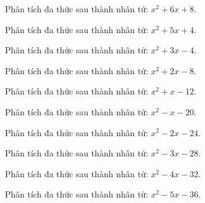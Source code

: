 \begin{bt}
	Phân tích đa thức sau thành nhân tử: $x^2 + 6 x + 8$.
\end{bt}
\begin{bt}
	Phân tích đa thức sau thành nhân tử: $x^2 + 5 x + 4$.
\end{bt}
\begin{bt}
	Phân tích đa thức sau thành nhân tử: $x^2 + 3 x - 4$.
\end{bt}
\begin{bt}
	Phân tích đa thức sau thành nhân tử: $x^2 + 2 x - 8$.
\end{bt}
\begin{bt}
	Phân tích đa thức sau thành nhân tử: $x^2 + x - 12$.
\end{bt}
\begin{bt}
	Phân tích đa thức sau thành nhân tử: $x^2 - x - 20$.
\end{bt}
\begin{bt}
	Phân tích đa thức sau thành nhân tử: $x^2 - 2 x - 24$.
\end{bt}
\begin{bt}
	Phân tích đa thức sau thành nhân tử: $x^2 - 3 x - 28$.
\end{bt}
\begin{bt}
	Phân tích đa thức sau thành nhân tử: $x^2 - 4 x - 32$.
\end{bt}
\begin{bt}
	Phân tích đa thức sau thành nhân tử: $x^2 - 5 x - 36$.
\end{bt}
